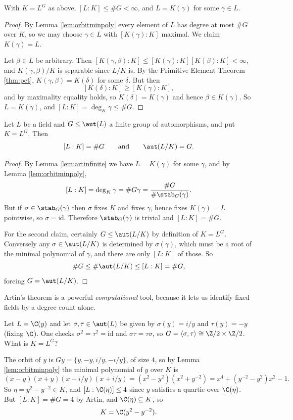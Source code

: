\begin{lemma}\label{lem:artinfinite}
	With $K = L^G$ as above, $[L:K] \leq \#G < \infty$, and $L = K(\gamma)$ for some $\gamma \in L$.
\end{lemma}

\begin{proof}
	By Lemma \ref{lem:orbitminpoly} every element of $L$ has degree at most $\#G$ over $K$, so we may choose $\gamma \in L$ with $[K(\gamma):K]$ maximal. We claim $K(\gamma) = L$.

	Let $\beta \in L$ be arbitrary. Then $[K(\gamma,\beta):K] \leq [K(\gamma):K][K(\beta):K] < \infty$, and $K(\gamma,\beta)/K$ is separable since $L/K$ is. By the Primitive Element Theorem \ref{thm:pet}, $K(\gamma,\beta) = K(\delta)$ for some $\delta$. But then
	$$[K(\delta):K] \geq [K(\gamma):K],$$
	and by maximality equality holds, so $K(\delta) = K(\gamma)$ and hence $\beta \in K(\gamma)$. So $L = K(\gamma)$, and $[L:K] = \deg_K\gamma \leq \#G$.
\end{proof}

\begin{theorem}[Artin]\label{thm:artin}
	Let $L$ be a field and $G \leq \aut(L)$ a finite group of automorphisms, and put $K = L^G$. Then
	$$[L : K] = \#G \qquad\text{and}\qquad \aut(L/K) = G.$$
\end{theorem}

\begin{proof}
	By Lemma \ref{lem:artinfinite} we have $L = K(\gamma)$ for some $\gamma$, and by Lemma \ref{lem:orbitminpoly},
	$$[L:K] = \deg_K \gamma = \#G\gamma = \frac{\#G}{\#\stab_G(\gamma)}.$$
	But if $\sigma \in \stab_G(\gamma)$ then $\sigma$ fixes $K$ and fixes $\gamma$, hence fixes $K(\gamma) = L$ pointwise, so $\sigma = \mathrm{id}$. Therefore $\stab_G(\gamma)$ is trivial and $[L:K] = \#G$.

	For the second claim, certainly $G \leq \aut(L/K)$ by definition of $K = L^G$. Conversely any $\sigma \in \aut(L/K)$ is determined by $\sigma(\gamma)$, which must be a root of the minimal polynomial of $\gamma$, and there are only $[L:K]$ of those. So
	$$\#G \leq \#\aut(L/K) \leq [L:K] = \#G,$$
	forcing $G = \aut(L/K)$.
\end{proof}

Artin's theorem is a powerful \emph{computational} tool, because it lets us identify fixed fields by a degree count alone.

\begin{example}
	Let $L = \C(y)$ and let $\sigma, \tau \in \aut(L)$ be given by $\sigma(y) = i/y$ and $\tau(y) = -y$ (fixing $\C$). One checks $\sigma^2 = \tau^2 = \mathrm{id}$ and $\sigma\tau = \tau\sigma$, so $G = \langle \sigma,\tau\rangle \cong \Z/2\times\Z/2$. What is $K = L^G$?

	The orbit of $y$ is $Gy = \{y, -y, i/y, -i/y\}$, of size $4$, so by Lemma \ref{lem:orbitminpoly} the minimal polynomial of $y$ over $K$ is
	$$(x-y)(x+y)(x - i/y)(x+i/y) = (x^2-y^2)(x^2 + y^{-2}) = x^4 + (y^{-2} - y^2)x^2 - 1.$$
	So $\eta = y^2 - y^{-2} \in K$, and $[L : \C(\eta)] \leq 4$ since $y$ satisfies a quartic over $\C(\eta)$. But $[L:K] = \#G = 4$ by Artin, and $\C(\eta) \subseteq K$, so
	$$K = \C(y^2 - y^{-2}).$$
\end{example}

